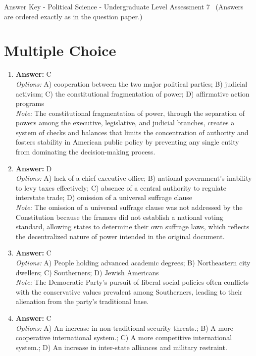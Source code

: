 \documentclass[12pt]{article}
\begin{document}
\begin{center}
Answer Key - Political Science - Undergraduate Level Assessment 7 \
\small (Answers are ordered exactly as in the question paper.)
\end{center}

\section*{Multiple Choice}
\begin{enumerate}[label=\arabic*.]
\item \textbf{Answer:} C
\\ \textit{Options:} A) cooperation between the two major political parties; B) judicial activism; C) the constitutional fragmentation of power; D) affirmative action programs
\\ \textit{Note:} The constitutional fragmentation of power, through the separation of powers among the executive, legislative, and judicial branches, creates a system of checks and balances that limits the concentration of authority and fosters stability in American public policy by preventing any single entity from dominating the decision-making process.
\item \textbf{Answer:} D
\\ \textit{Options:} A) lack of a chief executive office; B) national government's inability to levy taxes effectively; C) absence of a central authority to regulate interstate trade; D) omission of a universal suffrage clause
\\ \textit{Note:} The omission of a universal suffrage clause was not addressed by the Constitution because the framers did not establish a national voting standard, allowing states to determine their own suffrage laws, which reflects the decentralized nature of power intended in the original document.
\item \textbf{Answer:} C
\\ \textit{Options:} A) People holding advanced academic degrees; B) Northeastern city dwellers; C) Southerners; D) Jewish Americans
\\ \textit{Note:} The Democratic Party's pursuit of liberal social policies often conflicts with the conservative values prevalent among Southerners, leading to their alienation from the party's traditional base.
\item \textbf{Answer:} C
\\ \textit{Options:} A) An increase in non-traditional security threats.; B) A more cooperative international system.; C) A more competitive international system.; D) An increase in inter-state alliances and military restraint.

\end{enumerate}
\end{document}
